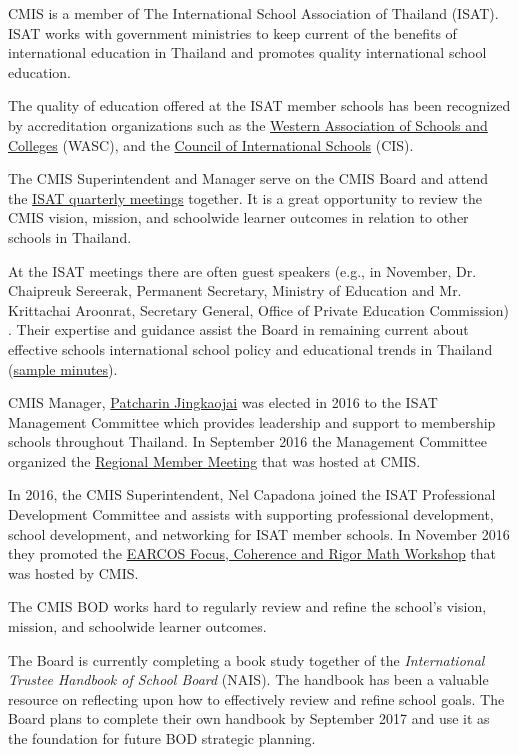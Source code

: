 \begin{findings}
CMIS is a member of The International School Association of Thailand (ISAT). ISAT works with government ministries to keep current of the benefits of international education in Thailand and promotes quality international school education.

The quality of education offered at the ISAT member schools has been recognized by accreditation organizations such as the \href{https://en.wikipedia.org/wiki/Western_Association_of_Schools_and_Colleges}{Western Association of Schools and Colleges} (WASC), and the \href{https://en.wikipedia.org/w/index.php?title=Council_of_International_Schools&action=edit&redlink=1}{Council of International Schools} (CIS).

The CMIS Superintendent and Manager serve on the CMIS Board and attend the \href{https://drive.google.com/a/cmis.ac.th/file/d/0Bwny3HLdIIS7LUtqTlR2REhsLVBkWHVib3k3V1hsWVFtUzIw/view?usp=sharing}{ISAT quarterly meetings} together. It is a great opportunity to review the CMIS vision, mission, and schoolwide learner outcomes in relation to other schools in Thailand. 

At the ISAT meetings there are often guest speakers (e.g., in November, Dr. Chaipreuk Sereerak, Permanent Secretary, Ministry of Education and Mr. Krittachai Aroonrat, Secretary General, Office of Private Education Commission) . Their expertise and guidance assist the Board in remaining current about effective schools international school policy and educational trends in Thailand (\href{http://www.isat.or.th/members/announcement-updates/minutes-isat-general-member-meeting-22016}{sample minutes}).

CMIS Manager, \href{https://drive.google.com/a/cmis.ac.th/file/d/0Bwo-i12FeO0rY1V1SGtuSzJBd1U/view?usp=sharing}{Patcharin Jingkaojai} was elected in 2016 to the ISAT Management Committee which provides leadership and support to membership schools throughout Thailand. In September 2016 the Management Committee organized the \href{https://drive.google.com/a/cmis.ac.th/file/d/0Bwo-i12FeO0rQ0JOZ09JVTNEUTA/view?usp=sharing}{Regional Member Meeting} that was hosted at CMIS. 

In 2016, the CMIS Superintendent, Nel Capadona joined the ISAT Professional Development Committee and assists with supporting professional development, school development, and networking for ISAT member schools. In November 2016 they promoted the \href{https://drive.google.com/a/cmis.ac.th/file/d/0ByVFfrm0zfolSXFEZFJVN1VOaTQ/view?usp=sharing}{EARCOS Focus, Coherence and Rigor Math Workshop} that was hosted by CMIS.


The CMIS BOD works hard to regularly review and refine the school’s vision, mission, and schoolwide learner outcomes. 

The Board is currently completing a book study together of the \textit{International Trustee Handbook of School Board} (NAIS). The handbook has been a valuable resource on reflecting upon how to effectively review and refine school goals. The Board plans to complete their own handbook by September 2017 and use it as the foundation for future BOD strategic planning.

\end{findings}


